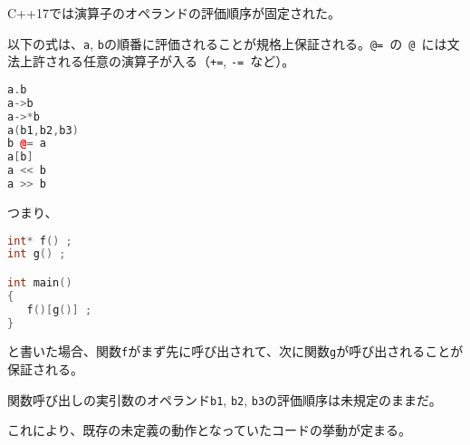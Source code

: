 %

C++17では演算子のオペランドの評価順序が固定された。

以下の式は、\lstinline!a!, \lstinline!b!の順番に評価されることが規格上保証される。\lstinline!@=!~の~\lstinline!@!~には文法上許される任意の演算子が入る（\lstinline!+=!, \lstinline!-=!~など）。

\begin{lstlisting}[language=C++]
a.b
a->b
a->*b
a(b1,b2,b3)
b @= a
a[b]
a << b
a >> b
\end{lstlisting}

つまり、
\begin{lstlisting}[language=C++]
int* f() ;
int g() ;

int main()
{
   f()[g()] ; 
}
\end{lstlisting}
と書いた場合、関数\lstinline!f!がまず先に呼び出されて、次に関数\lstinline!g!が呼び出されることが保証される。

関数呼び出しの実引数のオペランド\lstinline!b1!, \lstinline!b2!,
\lstinline!b3!の評価順序は未規定のままだ。

これにより、既存の未定義の動作となっていたコードの挙動が定まる。
